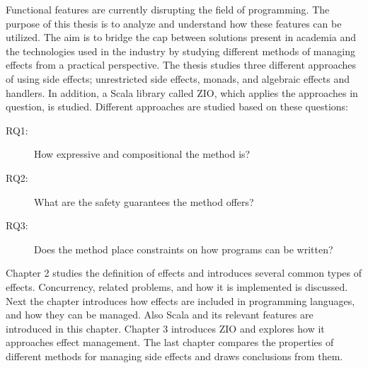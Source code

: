 Functional features are currently disrupting the field of programming. The purpose of this thesis is to analyze and understand how these features can be utilized. The aim is to bridge the cap between solutions present in academia and the technologies used in the industry by studying different methods of managing effects from a practical perspective. The thesis studies three different approaches of using side effects; unrestricted side effects, monads, and algebraic effects and handlers. In addition, a Scala library called ZIO, which applies the approaches in question, is studied. Different approaches are studied based on these questions:
\begin{description}
    \item[RQ1:] How expressive and compositional the method is?
    \item[RQ2:] What are the safety guarantees the method offers?
    \item[RQ3:] Does the method place constraints on how programs can be written?
\end{description}

Chapter 2 studies the definition of effects and introduces several common types of effects. Concurrency, related problems, and how it is implemented is discussed. Next the chapter introduces how effects are included in programming languages, and how they can be managed. Also Scala and its relevant features are introduced in this chapter. Chapter 3 introduces ZIO and explores how it approaches effect management.  The last chapter compares the properties of different methods for managing side effects and draws conclusions from them.

